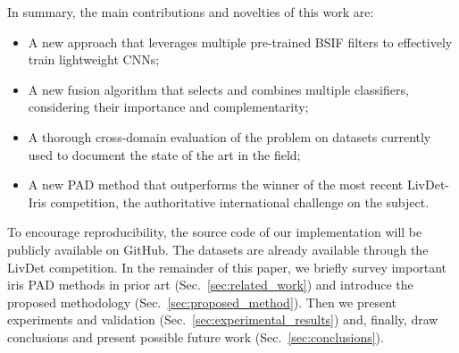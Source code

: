 In summary, the main contributions and novelties of this work are:
\begin{itemize}
    \item{A new approach that leverages multiple pre-trained BSIF filters to effectively train lightweight CNNs;}
    \item{A new fusion algorithm that selects and combines multiple classifiers, considering their importance and complementarity;}
    \item{A thorough cross-domain evaluation of the problem on datasets currently used to document the state of the art in the field;}
    \item{A new PAD method that outperforms the winner of the most recent LivDet-Iris competition, the authoritative international challenge on the subject.}
\end{itemize}

To encourage reproducibility, the source code of our implementation will be publicly available on GitHub. The datasets are already available through the LivDet competition. In the remainder of this paper, we briefly survey important iris PAD methods in prior art (Sec.~\ref{sec:related_work}) and introduce the proposed methodology (Sec.~\ref{sec:proposed_method}). Then we present experiments and validation (Sec.~\ref{sec:experimental_results}) and, finally, draw conclusions and present possible future work (Sec.~\ref{sec:conclusions}).

